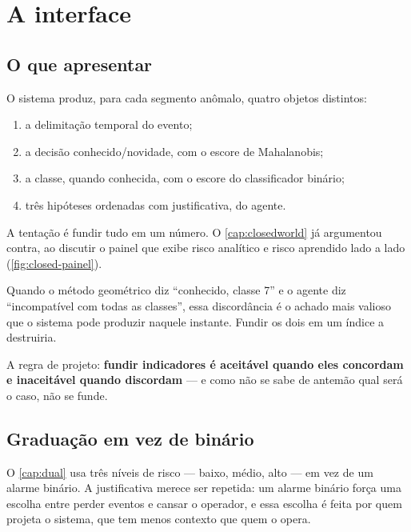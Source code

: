 \section{A interface}

\subsection{O que apresentar}

O sistema produz, para cada segmento anômalo, quatro objetos distintos:

\begin{enumerate}[leftmargin=*,itemsep=0.2em]
  \item a delimitação temporal do evento;
  \item a decisão conhecido/novidade, com o escore de Mahalanobis;
  \item a classe, quando conhecida, com o escore do classificador binário;
  \item três hipóteses ordenadas com justificativa, do agente.
\end{enumerate}

A tentação é fundir tudo em um número. O \cref{cap:closedworld} já argumentou contra, ao
discutir o painel que exibe risco analítico e risco aprendido lado a lado
(\cref{fig:closed-painel}).

\begin{destaque}
Quando o método geométrico diz ``conhecido, classe 7'' e o agente diz ``incompatível com
todas as classes'', essa discordância é o achado mais valioso que o sistema pode
produzir naquele instante. Fundir os dois em um índice a destruiria.

A regra de projeto: \textbf{fundir indicadores é aceitável quando eles concordam e
inaceitável quando discordam} --- e como não se sabe de antemão qual será o caso, não se
funde.
\end{destaque}

\subsection{Graduação em vez de binário}

O \cref{cap:dual} usa três níveis de risco --- baixo, médio, alto --- em vez de um
alarme binário. A justificativa merece ser repetida: um alarme binário força uma escolha
entre perder eventos e cansar o operador, e essa escolha é feita por quem projeta o
sistema, que tem menos contexto que quem o opera.

